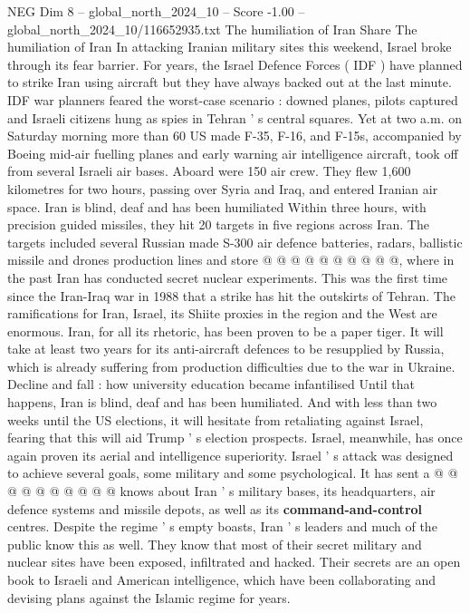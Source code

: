 \begin{textsample}{NEG Dim 8 – global\_north\_2024\_10 – Score -1.00 – global\_north\_2024\_10/116652935.txt}  \label{ex:f8_neg_201}
The humiliation of Iran Share The humiliation of Iran In attacking Iranian military sites this weekend, Israel broke through its fear barrier.
For years, the Israel Defence Forces ( IDF ) have planned to strike Iran using aircraft but they have always backed out at the last minute.
IDF war planners feared the worst-case scenario : downed planes, pilots captured and Israeli citizens hung as spies in Tehran ' s central squares.
Yet at two a.m. on Saturday morning more than 60 US made F-35, F-16, and F-15s, accompanied by Boeing mid-air fuelling planes and early warning air intelligence aircraft, took off from several Israeli air bases.
Aboard were 150 air crew.
They flew 1,600 kilometres for two hours, passing over Syria and Iraq, and entered Iranian air space.
Iran is blind, deaf and has been humiliated Within three hours, with precision guided missiles, they hit 20 targets in five regions across Iran.
The targets included several Russian made S-300 air defence batteries, radars, ballistic missile and drones production lines and store @ @ @ @ @ @ @ @ @ @, where in the past Iran has conducted secret nuclear experiments.
This was the first time since the Iran-Iraq war in 1988 that a strike has hit the outskirts of Tehran.
The ramifications for Iran, Israel, its Shiite proxies in the region and the West are enormous.
Iran, for all its rhetoric, has been proven to be a paper tiger.
It will take at least two years for its anti-aircraft defences to be resupplied by Russia, which is already suffering from production difficulties due to the war in Ukraine.
Decline and fall : how university education became infantilised Until that happens, Iran is blind, deaf and has been humiliated.
And with less than two weeks until the US elections, it will hesitate from retaliating against Israel, fearing that this will aid Trump ' s election prospects.
Israel, meanwhile, has once again proven its aerial and intelligence superiority.
Israel ' s attack was designed to achieve several goals, some military and some psychological.
It has sent a @ @ @ @ @ @ @ @ @ @ knows about Iran ' s military bases, its headquarters, air defence systems and missile depots, as well as its \textbf{command-and-control} centres.
Despite the regime ' s empty boasts, Iran ' s leaders and much of the public know this as well.
They know that most of their secret military and nuclear sites have been exposed, infiltrated and hacked.
Their secrets are an open book to Israeli and American intelligence, which have been collaborating and devising plans against the Islamic regime for years.

\end{textsample}

